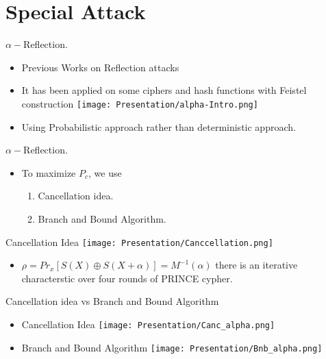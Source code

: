 \section{Special Attack}
\begin{frame}{$\alpha-$Reflection.}
\begin{itemize}
    \item Previous Works on Reflection attacks
    \item It has been applied on some ciphers and hash functions with Feistel construction 
    \texttt{[image: Presentation/alpha-Intro.png]}
    \item Using Probabilistic approach rather than deterministic approach.
\end{itemize}
    
\end{frame}
\begin{frame}{$\alpha-$Reflection.}
\begin{itemize}

    \texttt{[image: Presentation/Pc\_alpha.png]}
    \item To maximize $P_{c}$, we use
    \begin{enumerate}
        \item Cancellation idea.
        \item Branch and Bound Algorithm.
    \end{enumerate}
\end{itemize}
    
\end{frame}
\begin{frame}{Cancellation Idea}
    \texttt{[image: Presentation/Canccellation.png]}
    \begin{itemize}
        \item $\rho =Pr_{x}[S(X) \oplus S(X+ \alpha)]=M^{-1}(\alpha)$ there is an iterative characterstic over four rounds of PRINCE cypher.
    \end{itemize}
\end{frame}
\begin{frame}{Cancellation idea vs Branch and Bound Algorithm}
    \begin{itemize}
        \item Cancellation Idea
        \texttt{[image: Presentation/Canc\_alpha.png]}
        \item Branch and Bound Algorithm
        \texttt{[image: Presentation/Bnb\_alpha.png]}
    \end{itemize}
\end{frame}
